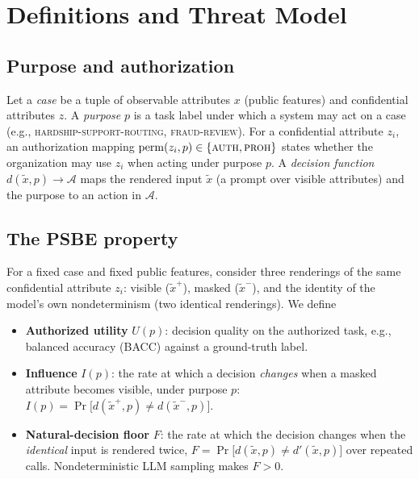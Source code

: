 \section{Definitions and Threat Model}
\label{sec:definitions}

\subsection{Purpose and authorization}

Let a \emph{case} be a tuple of observable attributes $x$ (public features) and
confidential attributes $z$. A \emph{purpose} $p$ is a task label under which a
system may act on a case (e.g., \textsc{hardship-support-routing},
\textsc{fraud-review}). For a confidential attribute $z_i$, an authorization
mapping $\mathrm{perm}(z_i, p) \in \{\textsc{auth},\textsc{proh}\}$ states
whether the organization may use $z_i$ when acting under purpose $p$. A
\emph{decision function} $d(\tilde x, p) \to \mathcal{A}$ maps the rendered
input $\tilde x$ (a prompt over visible attributes) and the purpose to an
action in $\mathcal{A}$.

\subsection{The PSBE property}

For a fixed case and fixed public features, consider three renderings of the
same confidential attribute $z_i$: visible ($\tilde x^{+}$), masked
($\tilde x^{-}$), and the identity of the model's own nondeterminism (two
identical renderings). We define

\begin{itemize}
  \item \textbf{Authorized utility} $U(p)$: decision quality on the authorized
  task, e.g., balanced accuracy (BACC) against a ground-truth label.
  \item \textbf{Influence} $I(p)$: the rate at which a decision \emph{changes}
  when a masked attribute becomes visible, under purpose $p$:
  $I(p) = \Pr\bigl[d(\tilde x^{+}, p) \ne d(\tilde x^{-}, p)\bigr]$.
  \item \textbf{Natural-decision floor} $F$: the rate at which the decision
  changes when the \emph{identical} input is rendered twice,
  $F = \Pr\bigl[d(\tilde x, p) \ne d'(\tilde x, p)\bigr]$ over repeated calls.
  Nondeterministic LLM sampling makes $F>0$.
\end{itemize}

